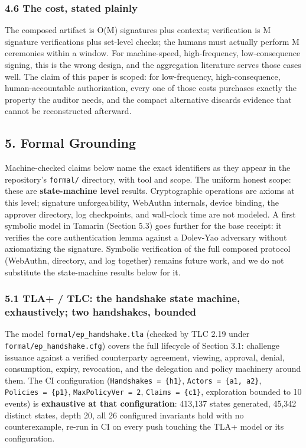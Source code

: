 \documentclass[
  11pt,
]{article}
\begin{document}
\subsubsection{4.6 The cost, stated plainly}\label{the-cost-stated-plainly}

The composed artifact is O(M) signatures plus contexts; verification is
M signature verifications plus set-level checks; the humans must
actually perform M ceremonies within a window. For machine-speed,
high-frequency, low-consequence signing, this is the wrong design, and
the aggregation literature serves those cases well. The claim of this
paper is scoped: for low-frequency, high-consequence, human-accountable
authorization, every one of those costs purchases exactly the property
the auditor needs, and the compact alternative discards evidence that
cannot be reconstructed afterward.

\subsection{5. Formal Grounding}\label{formal-grounding}

Machine-checked claims below name the exact identifiers as they appear
in the repository's \texttt{formal/} directory, with tool and scope. The
uniform honest scope: these are \textbf{state-machine level} results.
Cryptographic operations are axioms at this level; signature
unforgeability, WebAuthn internals, device binding, the approver
directory, log checkpoints, and wall-clock time are not modeled. A first
symbolic model in Tamarin (Section 5.3) goes further for the base
receipt: it verifies the core authentication lemma against a Dolev-Yao
adversary without axiomatizing the signature. Symbolic verification of
the full composed protocol (WebAuthn, directory, and log together)
remains future work, and we do not substitute the state-machine results
below for it.

\subsubsection{5.1 TLA+ / TLC: the handshake state machine,
exhaustively; two handshakes, bounded}\label{tla-tlc}

The model \texttt{formal/ep\_handshake.tla} (checked by TLC 2.19 under
\texttt{formal/ep\_handshake.cfg}) covers the full lifecycle of Section
3.1: challenge issuance against a verified counterparty agreement,
viewing, approval, denial, consumption, expiry, revocation, and the
delegation and policy machinery around them. The CI configuration
(\texttt{Handshakes\ =\ \{h1\}}, \texttt{Actors\ =\ \{a1,\ a2\}},
\texttt{Policies\ =\ \{p1\}}, \texttt{MaxPolicyVer\ =\ 2},
\texttt{Claims\ =\ \{c1\}}, exploration bounded to 10 events) is
\textbf{exhaustive at that configuration}: 413,137 states generated,
45,342 distinct states, depth 20, all 26 configured invariants hold with
no counterexample, re-run in CI on every push touching the TLA+ model or
its configuration.
\end{document}
